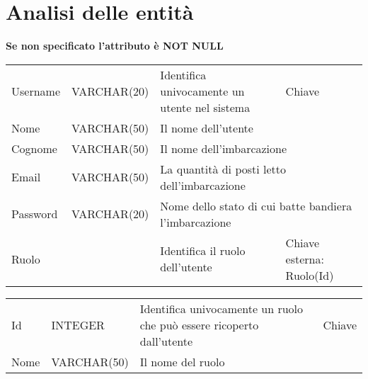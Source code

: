 \section{Analisi delle entità}

\textbf{Se non specificato l'attributo è NOT NULL}

\begin{center}
    \begin{tabularx}{\textwidth}{|l|l|l|X|}
        \hline
        \rowcolor{gray!30}
        \multicolumn{4}{|c|}{\textbf{UTENTE}}\\
        \hline
        Username & VARCHAR(20) & Identifica univocamente un utente nel sistema & Chiave\\
        \hline
        Nome & VARCHAR(50) & \multicolumn{2}{l|}{Il nome dell'utente} \\
        \hline
        Cognome & VARCHAR(50) & \multicolumn{2}{l|}{Il nome dell'imbarcazione} \\
        \hline
        Email & VARCHAR(50) & \multicolumn{2}{l|}{La quantità di posti letto dell'imbarcazione} \\
        \hline
        Password & VARCHAR(20) & \multicolumn{2}{l|}{Nome dello stato di cui batte bandiera l'imbarcazione} \\
        \hline
        Ruolo & & Identifica il ruolo dell'utente & Chiave esterna: Ruolo(Id)\\
        \hline
    \end{tabularx}
\end{center}

\begin{center}
    \begin{tabularx}{\textwidth}{|l|l|l|X|}
        \hline
        \rowcolor{gray!30}
        \multicolumn{4}{|c|}{\textbf{RUOLO}}\\
        \hline
        Id & INTEGER  & Identifica univocamente un ruolo che può essere ricoperto dall'utente & Chiave\\
        \hline
        Nome & VARCHAR(50) & \multicolumn{2}{l|}{Il nome del ruolo} \\
        \hline
    \end{tabularx}
\end{center}

